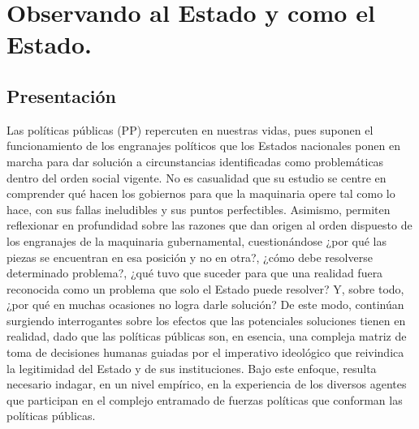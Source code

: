 \documentclass[
  spanish,
  11pt,
  a4paper,
]{scrbook}
\begin{document}
\mainmatter
{}

\chapter*{Observando al Estado y como el
Estado.}\label{observando-al-estado-y-como-el-estado.}


\vspace{-\baselineskip}

\section*{Presentación}\label{presentaciuxf3n}



Las políticas públicas (PP) repercuten en nuestras vidas, pues suponen
el funcionamiento de los engranajes políticos que los Estados nacionales
ponen en marcha para dar solución a circunstancias identificadas como
problemáticas dentro del orden social vigente. No es casualidad que su
estudio se centre en comprender qué hacen los gobiernos para que la
maquinaria opere tal como lo hace, con sus fallas ineludibles y sus
puntos perfectibles. Asimismo, permiten reflexionar en profundidad sobre
las razones que dan origen al orden dispuesto de los engranajes de la
maquinaria gubernamental, cuestionándose ¿por qué las piezas se
encuentran en esa posición y no en otra?, ¿cómo debe resolverse
determinado problema?, ¿qué tuvo que suceder para que una realidad fuera
reconocida como un problema que solo el Estado puede resolver? Y, sobre
todo, ¿por qué en muchas ocasiones no logra darle solución? De este
modo, continúan surgiendo interrogantes sobre los efectos que las
potenciales soluciones tienen en realidad, dado que las políticas
públicas son, en esencia, una compleja matriz de toma de decisiones
humanas guiadas por el imperativo ideológico que reivindica la
legitimidad del Estado y de sus instituciones. Bajo este enfoque,
resulta necesario indagar, en un nivel empírico, en la experiencia de
los diversos agentes que participan en el complejo entramado de fuerzas
políticas que conforman las políticas públicas.
\end{document}
